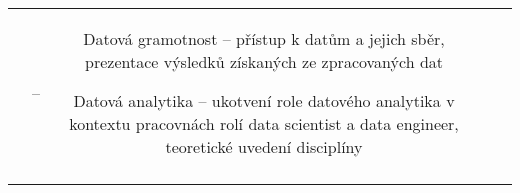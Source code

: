 \begin{landscape}
\begin{table}[htbp]
{\begin{tabularx}{\linewidth}{CCCCC}
&

–

&

Datová gramotnost – přístup k datům a jejich sběr, prezentace výsledků získaných ze zpracovaných dat

Datová analytika – ukotvení role datového analytika v kontextu pracovnách rolí data scientist a data engineer, teoretické uvedení disciplíny  

\\

\tabularnewline
\bottomrule
\end{tabularx}

}

\end{table}

\end{landscape}